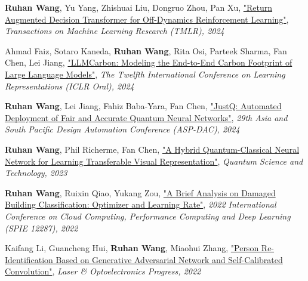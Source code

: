 \documentclass[letterpaper,10.8pt]{article}
\begin{document}
\begin{description}[font=$\bullet$]
\item {\textbf{Ruhan Wang}, Yu Yang, Zhishuai Liu, Dongruo Zhou, Pan Xu, \href{https://arxiv.org/abs/2410.23450}{"Return Augmented Decision Transformer for Off-Dynamics Reinforcement Learning"}, \textit{Transactions on Machine Learning Research (TMLR), 2024}}
\item {Ahmad Faiz, Sotaro Kaneda, \textbf{Ruhan Wang}, Rita Osi, Parteek Sharma, Fan Chen, Lei Jiang, \href{https://arxiv.org/abs/2309.14393}{"LLMCarbon: Modeling the End-to-End Carbon Footprint of Large Language Models"}, \textit{The Twelfth International Conference on Learning Representations (ICLR Oral), 2024}}
\item {\textbf{Ruhan Wang}, Lei Jiang, Fahiz Baba-Yara, Fan Chen, \href{https://arxiv.org/abs/2403.11048}{"JustQ: Automated Deployment of Fair and Accurate Quantum Neural Networks"}, \textit{29th Asia and South Pacific Design Automation Conference (ASP-DAC), 2024}}
\item {\textbf{Ruhan Wang}, Phil Richerme, Fan Chen, \href{https://iopscience.iop.org/article/10.1088/2058-9565/acf1c7}{"A Hybrid Quantum-Classical Neural Network for Learning Transferable Visual Representation"}, \textit{Quantum Science and Technology, 2023}}
\item {\textbf{Ruhan Wang}, Ruixin Qiao, Yukang Zou, \href{https://www.spiedigitallibrary.org/conference-proceedings-of-spie/12287/122871H/A-brief-analysis-on-damaged-building-classification--optimizer-and/10.1117/12.2640965.full}{"A Brief Analysis on Damaged Building Classification: Optimizer and Learning Rate"}, \textit{2022 International Conference on Cloud Computing, Performance Computing and Deep Learning (SPIE 12287), 2022}}
\item {Kaifang Li, Guancheng Hui, \textbf{Ruhan Wang}, Miaohui Zhang, \href{https://www.researching.cn/ArticlePdf/m00002/2022/59/10/1015007.pdf}{"Person Re-Identification Based on Generative Adversarial Network and Self-Calibrated Convolution"}, \textit{Laser \& Optoelectronics Progress, 2022}}
\end{description}


\end{document}
